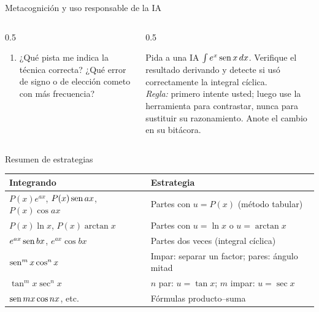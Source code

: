 \documentclass[10pt,aspectratio=169]{beamer}
\begin{document}
\begin{frame}{Metacognición y uso responsable de la IA}
  \small
  \begin{columns}[t]
    \begin{column}{0.5\textwidth}
      \begin{metacog}
        \begin{enumerate}
          \metacomun
          \item ¿Qué pista me indica la técnica correcta? ¿Qué error de signo o de elección cometo con más frecuencia?
        \end{enumerate}
      \end{metacog}
    \end{column}
    \begin{column}{0.5\textwidth}
      \begin{iabox}
        Pida a una IA $\int e^x\operatorname{sen} x\,dx$. Verifique el resultado derivando y detecte si usó correctamente la integral cíclica.\\[2pt]
        \textit{Regla:} primero intente usted; luego use la herramienta para contrastar, nunca para sustituir su razonamiento. Anote el cambio en su bitácora.
      \end{iabox}
    \end{column}
  \end{columns}
\end{frame}

\begin{frame}{Resumen de estrategias}
  \renewcommand{\arraystretch}{1.5}
  \begin{tabular}{p{4.6cm}|p{9.4cm}}
    \textbf{Integrando} & \textbf{Estrategia}\\ \hline
    $P(x)e^{ax}$, $P(x)\operatorname{sen} ax$, $P(x)\cos ax$ & Partes con $u=P(x)$ (método tabular)\\
    $P(x)\ln x$, $P(x)\arctan x$ & Partes con $u=\ln x$ o $u=\arctan x$\\
    $e^{ax}\operatorname{sen} bx$, $e^{ax}\cos bx$ & Partes dos veces (integral cíclica)\\
    $\operatorname{sen}^mx\cos^nx$ & Impar: separar un factor; pares: ángulo mitad\\
    $\tan^mx\sec^nx$ & $n$ par: $u=\tan x$; $m$ impar: $u=\sec x$\\
    $\operatorname{sen} mx\cos nx$, etc. & Fórmulas producto--suma
  \end{tabular}
\end{frame}
\end{document}
